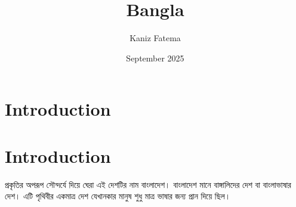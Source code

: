 \documentclass{article}
\title{Bangla}
\author{Kaniz Fatema}
\date{September 2025}
\begin{document}
\maketitle

\section{Introduction}

\bangla
\section{Introduction}

\bangla
প্রকৃতির অপরূপ সৌন্দর্যে দিয়ে ঘেরা এই দেশটির নাম বাংলাদেশ। বাংলাদেশ মানে বাঙ্গালিদের দেশ বা বাংলাভাষার দেশ।
এটি পৃথিবীর একমাত্র দেশ যেখানকার মানুষ শুধু মাত্র ভাষার জন্য প্রান দিয়ে ছিল। 
\end{document}
